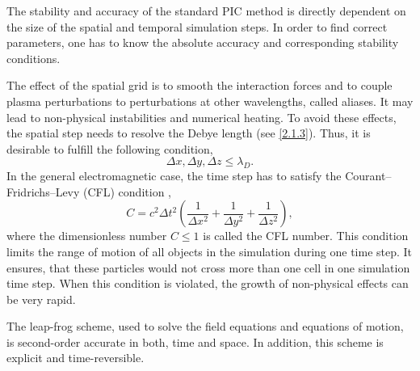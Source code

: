 The stability and accuracy of the standard PIC method is directly dependent on the size of the spatial and temporal simulation steps. In order to find correct parameters, one has to know the absolute accuracy and corresponding stability conditions.

The effect of the spatial grid is to smooth the interaction forces and to couple plasma perturbations to perturbations at other wavelengths, called aliases. It may lead to non-physical instabilities and numerical heating. To avoid these effects, the spatial step needs to resolve the Debye length (see \ref{2.1.3}). Thus, it is desirable to fulfill the following condition,
\begin{equation}
\Delta x, \Delta y, \Delta z \leq \lambda_{D}.
\end{equation}
In the general electromagnetic case, the time step has to satisfy the Courant--Fridrichs--Levy (CFL) condition \cite{jaroszynsky},
\begin{equation}
\label{3.1.4.1}
C = c^{2} \Delta t^{2} \left(\frac{1}{\Delta x^{2}} + \frac{1}{\Delta y^{2}} + \frac{1}{\Delta z^{2}}\right),
\end{equation}
where the dimensionless number $ C \leq 1 $ is called the CFL number. This condition limits the range of motion of all objects in the simulation during one time step. It ensures, that these particles would not cross more than one cell in one simulation time step. When this condition is violated, the growth of non-physical effects can be very rapid. 

The leap-frog scheme, used to solve the field equations and equations of motion, is second-order accurate in both, time and space. In addition, this scheme is explicit and time-reversible.